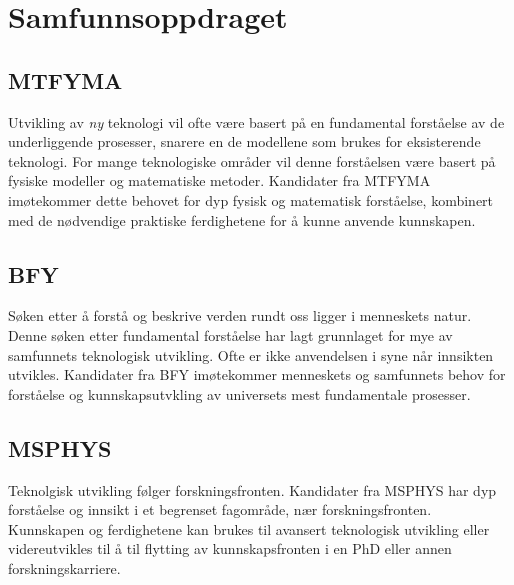 \chapter{Samfunnsoppdraget}
\label{c:mission}

\section{MTFYMA}
Utvikling av \emph{ny} teknologi vil ofte være basert på en fundamental forståelse av de underliggende prosesser, snarere en de modellene som brukes for eksisterende teknologi. For mange teknologiske områder vil denne forståelsen være basert på fysiske modeller og matematiske metoder. Kandidater fra MTFYMA imøtekommer dette behovet for dyp fysisk og matematisk forståelse, kombinert med de nødvendige praktiske ferdighetene for å kunne anvende kunnskapen.

\section{BFY}
Søken etter å forstå og beskrive verden rundt oss ligger i menneskets natur. Denne søken etter fundamental forståelse har lagt grunnlaget for mye av samfunnets teknologisk utvikling. Ofte er ikke anvendelsen i syne når innsikten utvikles. Kandidater fra BFY imøtekommer menneskets og samfunnets behov for forståelse og kunnskapsutvkling av universets mest fundamentale prosesser.

\section{MSPHYS}
Teknolgisk utvikling følger forskningsfronten. Kandidater fra MSPHYS har dyp forståelse og innsikt i et begrenset fagområde, nær forskningsfronten. Kunnskapen og ferdighetene kan brukes til avansert teknologisk utvikling eller videreutvikles til å til flytting av kunnskapsfronten i en PhD eller annen forskningskarriere.